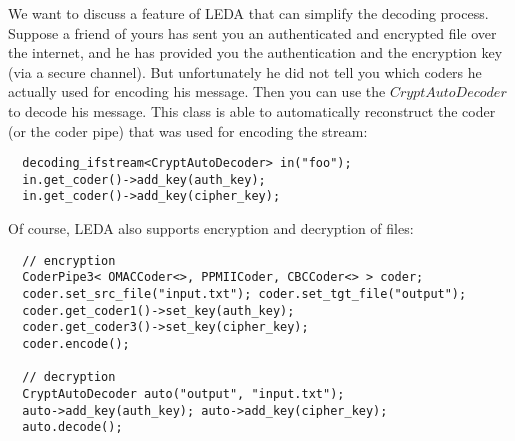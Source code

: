 We want to discuss a feature of LEDA that can simplify the decoding process. 
Suppose a friend of yours has sent you an authenticated and encrypted file over
the internet, and he has provided you the authentication and the encryption key
(via a secure channel). But unfortunately he did not tell you which coders he
actually used for encoding his message. 
Then you can use the $\mathit{CryptAutoDecoder}$ to decode his message. This
class is able to automatically reconstruct the coder (or the coder pipe) that 
was used for encoding the stream:
\begin{verbatim}
  decoding_ifstream<CryptAutoDecoder> in("foo");
  in.get_coder()->add_key(auth_key);
  in.get_coder()->add_key(cipher_key);
\end{verbatim}

Of course, LEDA also supports encryption and decryption of files:
\begin{verbatim}
  // encryption
  CoderPipe3< OMACCoder<>, PPMIICoder, CBCCoder<> > coder;
  coder.set_src_file("input.txt"); coder.set_tgt_file("output");
  coder.get_coder1()->set_key(auth_key);
  coder.get_coder3()->set_key(cipher_key);
  coder.encode();

  // decryption
  CryptAutoDecoder auto("output", "input.txt");
  auto->add_key(auth_key); auto->add_key(cipher_key);
  auto.decode();
\end{verbatim}

